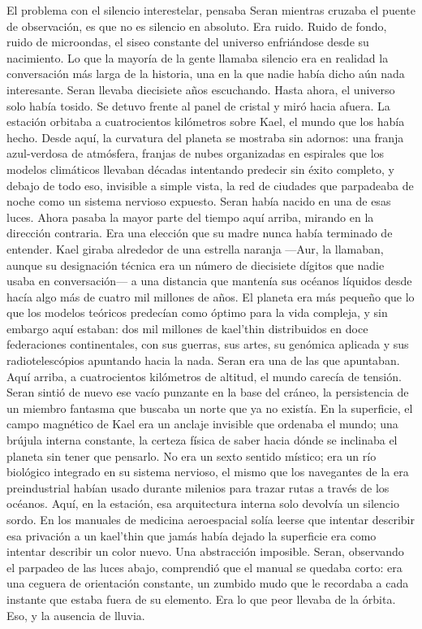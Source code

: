 \documentclass[11pt,a5paper,twoside]{book}
\begin{document}
El problema con el silencio interestelar, pensaba Seran mientras cruzaba el puente de observación, es que no es silencio en absoluto.
Era ruido. Ruido de fondo, ruido de microondas, el siseo constante del universo enfriándose desde su nacimiento. Lo que la mayoría de la gente llamaba silencio era en realidad la conversación más larga de la historia, una en la que nadie había dicho aún nada interesante. Seran llevaba diecisiete años escuchando. Hasta ahora, el universo solo había tosido.
Se detuvo frente al panel de cristal y miró hacia afuera.
La estación orbitaba a cuatrocientos kilómetros sobre Kael, el mundo que los había hecho. Desde aquí, la curvatura del planeta se mostraba sin adornos: una franja azul-verdosa de atmósfera, franjas de nubes organizadas en espirales que los modelos climáticos llevaban décadas intentando predecir sin éxito completo, y debajo de todo eso, invisible a simple vista, la red de ciudades que parpadeaba de noche como un sistema nervioso expuesto. Seran había nacido en una de esas luces. Ahora pasaba la mayor parte del tiempo aquí arriba, mirando en la dirección contraria.
Era una elección que su madre nunca había terminado de entender.
Kael giraba alrededor de una estrella naranja —Aur, la llamaban, aunque su designación técnica era un número de diecisiete dígitos que nadie usaba en conversación— a una distancia que mantenía sus océanos líquidos desde hacía algo más de cuatro mil millones de años. El planeta era más pequeño que lo que los modelos teóricos predecían como óptimo para la vida compleja, y sin embargo aquí estaban: dos mil millones de kael'thin distribuidos en doce federaciones continentales, con sus guerras, sus artes, su genómica aplicada y sus radiotelescópios apuntando hacia la nada.
Seran era una de las que apuntaban.
Aquí arriba, a cuatrocientos kilómetros de altitud, el mundo carecía de tensión. Seran sintió de nuevo ese vacío punzante en la base del cráneo, la persistencia de un miembro fantasma que buscaba un norte que ya no existía. En la superficie, el campo magnético de Kael era un anclaje invisible que ordenaba el mundo; una brújula interna constante, la certeza física de saber hacia dónde se inclinaba el planeta sin tener que pensarlo. No era un sexto sentido místico; era un río biológico integrado en su sistema nervioso, el mismo que los navegantes de la era preindustrial habían usado durante milenios para trazar rutas a través de los océanos. Aquí, en la estación, esa arquitectura interna solo devolvía un silencio sordo. En los manuales de medicina aeroespacial solía leerse que intentar describir esa privación a un kael'thin que jamás había dejado la superficie era como intentar describir un color nuevo. Una abstracción imposible. Seran, observando el parpadeo de las luces abajo, comprendió que el manual se quedaba corto: era una ceguera de orientación constante, un zumbido mudo que le recordaba a cada instante que estaba fuera de su elemento. Era lo que peor llevaba de la órbita. Eso, y la ausencia de lluvia.
\end{document}
